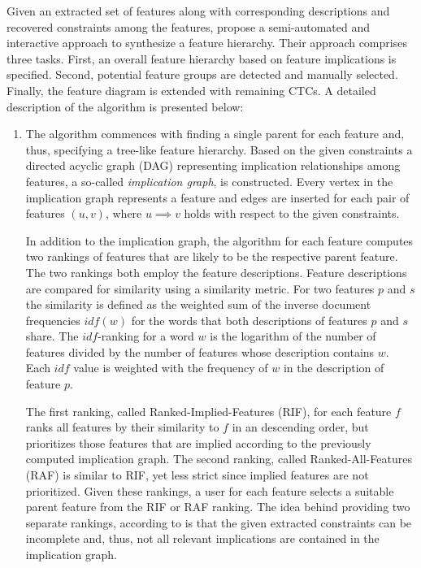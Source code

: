 Given an extracted set of features along with corresponding descriptions and
recovered constraints among the features, \cite{she_reverse_2011} propose a
semi-automated and interactive approach to synthesize a feature hierarchy.
Their approach comprises three tasks. First, an overall feature hierarchy based
on feature implications is specified. Second, potential feature groups are
detected and manually selected. Finally, the feature diagram is extended with
remaining CTCs. A detailed description of the algorithm is presented below:

\begin{enumerate}
  \item The algorithm commences with finding a single parent for each
  feature and, thus, specifying a tree-like feature hierarchy. Based on the
  given constraints a directed acyclic graph (DAG) representing implication
  relationships among features, a so-called \emph{implication graph}, is
  constructed.
  Every vertex in the implication graph represents a feature  and edges are
  inserted for each pair of features $(u, v)$, where  $u \implies v$ holds with respect to the given
  constraints.
   
  In addition to the implication graph, the algorithm for each feature computes
  two rankings of features that are likely to be the respective parent feature.
  The two rankings both employ the feature descriptions. Feature descriptions
  are compared for similarity using a similarity metric. For two features $p$
  and $s$ the similarity is defined as the weighted sum of the inverse document
  frequencies $idf(w)$ for the words that both descriptions of features $p$
  and $s$ share.
  The $idf$-ranking for a word $w$ is the logarithm of the number of features
  divided by the number of features whose description contains $w$. Each $idf$
  value is weighted with the frequency of $w$ in the description of
  feature $p$.
  
  The first ranking, called Ranked-Implied-Features (RIF), for each feature $f$
  ranks all features by their similarity to $f$ in an descending order, but
  prioritizes those features that are implied according to the previously
  computed implication graph. The second ranking, called Ranked-All-Features
  (RAF) is similar to RIF, yet less strict since implied features are not
  prioritized. Given these rankings, a user for each feature selects a suitable
  parent feature from the RIF or RAF ranking. The idea behind providing two
  separate rankings, according to \cite{she_reverse_2011} is that the given
  extracted constraints can be incomplete and, thus, not all relevant
  implications are contained in the implication graph.


\end{enumerate}
